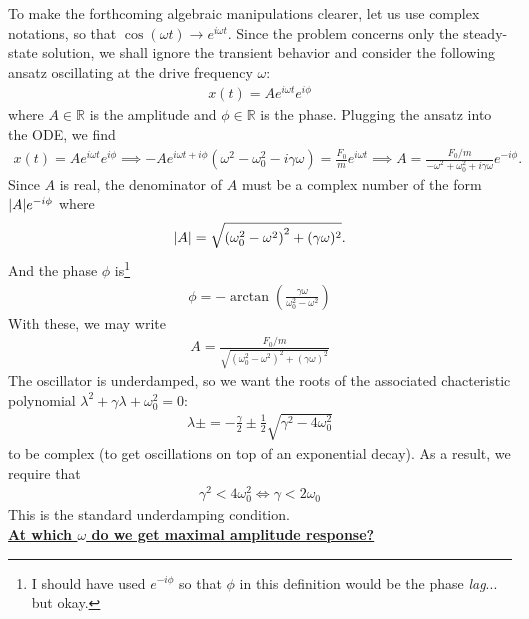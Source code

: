 \documentclass{book}
\theoremstyle{definition}
\newcommand{\f}[2]{\frac{#1}{#2}}
\newcommand{\lp}{\left(}
\newcommand{\rp}{\right)}
\begin{document}
To make the forthcoming algebraic manipulations clearer, let us use complex notations, so that $\cos(\omega t) \to e^{i\omega t}$. Since the problem concerns only the steady-state solution, we shall ignore the transient behavior and consider the following ansatz oscillating at the drive frequency $\omega$:
\begin{align*}
x(t) = A e^{i\omega t } e^{i\phi}
\end{align*}
where $A \in \mathbb{R}$ is the amplitude and $\phi \in \mathbb{R}$ is the phase. Plugging the ansatz into the ODE, we find 
\begin{align*}
x(t) = A e^{i\omega t} e^{i\phi} \implies -A e^{i \omega t + i\phi} \lp \omega^2 -\omega_0^2 - i\gamma \omega \rp = \f{F_0}{m}e^{i\omega t} \implies A = \f{F_0/m}{-\omega^2 + \omega_0^2 + i\gamma \omega} e^{-i\phi}.
\end{align*}
Since $A$ is real, the denominator of $A$ must be a complex number of the form $\abs{A} e^{-i\phi}$ where
\begin{align*}
\abs{A} = \sqrt{{(\omega_0^2 - \omega^2)}^2 + (\gamma \omega)^2}.
\end{align*}
And the phase $\phi$ is\footnote{I should have used $e^{-i\phi}$ so that $\phi$ in this definition would be the phase \textit{lag}... but okay.}
\begin{align*}
\boxed{\phi = -\arctan(\f{\gamma\omega}{\omega_0^2 - \omega^2})}
\end{align*}
With these, we may write
\begin{align*}
\boxed{A = \f{F_0/m}{\sqrt{(\omega_0^2 - \omega^2)^2 + (\gamma \omega)^2}}}
\end{align*}
The oscillator is underdamped, so we want the roots of the associated chacteristic polynomial $\lambda^2 + \gamma \lambda + \omega_0^2 = 0$:
\begin{align*}
\lambda\pm = -\f{\gamma}{2} \pm \f{1}{2}\sqrt{\gamma^2 - 4\omega_0^2}
\end{align*}
to be complex (to get oscillations on top of an exponential decay). As a result, we require that 
\begin{align*}
\gamma^2 < 4\omega_0^2 \iff \boxed{\gamma < 2\omega_0}
\end{align*}
This is the standard underdamping condition. \\


\noindent \textbf{\underline{At which $\omega$ do we get maximal amplitude response?}} \\
\end{document}
